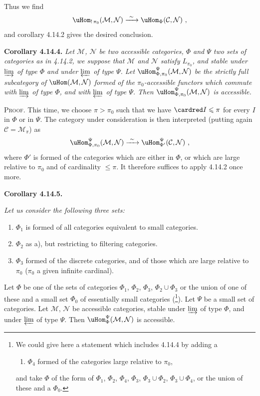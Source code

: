 
Thus we find
\[
\uHom_{!\,\pi_0}(\mathcal{M},\mathcal{N}) \xrightarrow{\ \sim\ } \uHom_{\Phi}(\mathcal{C},\mathcal{N})\ ,
\]
and corollary 4.14.2 gives the desired conclusion.

\noindent\textbf{Corollary 4.14.4.} {\itshape Let $\mathcal{M}$, $\mathcal{N}$ be two accessible categories, $\Phi$ and $\Psi$ two sets of categories as in 4.14.2, we suppose that $\mathcal{M}$ and $\mathcal{N}$ satisfy $L_{\pi_0}$, and stable under $\varinjlim$ of type $\Phi$ and under $\varprojlim$ of type $\Psi$. Let $\uHom^{\Psi}_{\Phi,\pi_0}(\mathcal{M},\mathcal{N})$ be the strictly full subcategory of $\uHom(\mathcal{M},\mathcal{N})$ formed of the $\pi_0$-accessible functors which commute with $\varinjlim$ of type $\Phi$, and with $\varprojlim$ of type $\Psi$. Then $\uHom^{\Psi}_{\Phi,\pi_0}(\mathcal{M},\mathcal{N})$ is accessible.}

\noindent\textsc{Proof}. This time, we choose $\pi>\pi_0$ such that we have $\cardred I\leqslant\pi$ for every $I$ in $\Phi$ or in $\Psi$. The category under consideration is then interpreted (putting again $\mathcal{C}=\mathcal{M}_\pi$) as
\[
\uHom^{\Psi}_{\Phi,\pi_0}(\mathcal{M},\mathcal{N}) \xrightarrow{\ \sim\ } \uHom^{\Psi}_{\Phi'}(\mathcal{C},\mathcal{N})\ ,
\]
where $\Phi'$ is formed of the categories which are either in $\Phi$, or which are large relative to $\pi_0$ and of cardinality $\leqslant\pi$. It therefore suffices to apply 4.14.2 once more.

\noindent\textbf{Corollary 4.14.5.} {\itshape Let us consider the following three sets:
\begin{enumerate}[leftmargin=2.5em]
\item[\textit{a)}] $\Phi_1$ is formed of all categories equivalent to small categories.
\item[\textit{b)}] $\Phi_2$ as a), but restricting to filtering categories.
\item[\textit{c)}] $\Phi_3$ formed of the discrete categories, and of those which are large relative to $\pi_0$ ($\pi_0$ a given infinite cardinal).
\end{enumerate}
\noindent Let $\Phi$ be one of the sets of categories $\Phi_1$, $\Phi_2$, $\Phi_3$, $\Phi_2\cup\Phi_3$ or the union of one of these and a small set $\Phi_0$ of essentially small categories (\footnote[165]{We could give here a statement which includes 4.14.4 by adding a
\begin{enumerate}[leftmargin=2.5em]
\item[d)] $\Phi_4$ formed of the categories large relative to $\pi_0$,
\end{enumerate}
\noindent and take $\Phi$ of the form of $\Phi_1$, $\Phi_2$, $\Phi_4$, $\Phi_3$, $\Phi_3\cup\Phi_2$, $\Phi_3\cup\Phi_4$, or the union of these and a $\Phi_0$.}). Let $\Psi$ be a small set of categories. Let $\mathcal{M}$, $\mathcal{N}$ be accessible categories, stable under $\varinjlim$ of type $\Phi$, and under $\varprojlim$ of type $\Psi$. Then $\uHom^{\Psi}_{\Phi}(\mathcal{M},\mathcal{N})$ is accessible.}

